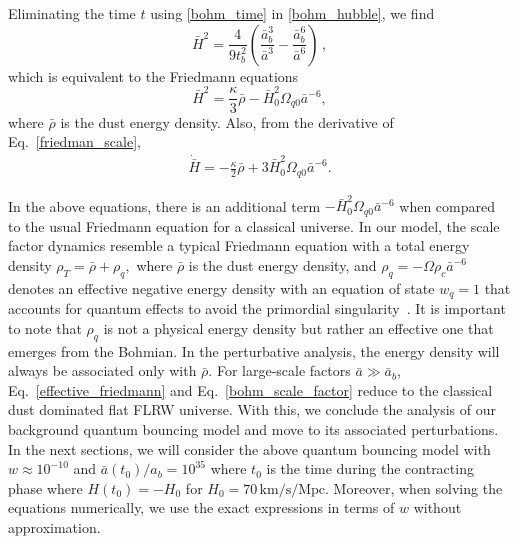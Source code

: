 \documentclass[a4paper,11pt]{article}
\newcommand{\dpar}[1]{\left(#1 \right)}
\begin{document}
Eliminating the time $t$ using \eqref{bohm_time} in \eqref{bohm_hubble}, we find
\begin{equation}
	\label{friedman_scale}
	\bar{H}^{2} = \frac{ 4 }{ 9t^{2}_{b}}\dpar
	{ \frac{ \bar{a}^{3}_{b} }{ \bar{a}^{3} } - \frac{\bar{a}_{b}^{6}}{ \bar{a}^{6} } }\, ,
\end{equation}
which is equivalent to the Friedmann equations
\begin{equation}\label{effective_friedmann}
	\bar{H}^{2} = \frac{\kappa}{ 3 }\bar\rho - \bar{H}^{2}_{0}\Omega_{q0}\bar{a}^{-6},
\end{equation}
where $\bar\rho$ is the dust energy density. {\color{red} Also, from the derivative of
		Eq.~\eqref{friedman_scale},
		\begin{align}
			\dot{\bar{H}} = - \frac{\kappa}{2} \bar\rho + 3\bar{H}^{2}_{0}\Omega_{q0}\bar{a}^{-6}.
		\end{align}
	}

In the above equations, there is an additional term
$-\bar{H}^{2}_{0}\Omega_{q0}\bar{a}^{-6}$ when compared to the usual Friedmann equation
for a classical universe. {\color{red} In our model, the scale factor dynamics resemble
		a typical Friedmann equation with a total energy density $\rho_{T} = \bar{\rho} +
			\rho_{q},$ where $\bar{\rho}$ is the dust energy density, and $\rho_{q} = -\Omega
			\rho_{c} \bar{a}^{-6}$ denotes an effective negative energy density with an equation of
		state $w_q = 1$ that accounts for quantum effects to avoid the primordial
		singularity~\cite{vitenti2012large}. It is important to note that $\rho_{q}$ is not a
		physical energy density but rather an effective one that emerges from the Bohmian. In
		the perturbative analysis, the energy density will always be associated only with
		$\bar{\rho}$. For large-scale factors $\bar{a} \gg \bar{a}_{b} $,
		Eq.~\eqref{effective_friedmann} and Eq.~\eqref{bohm_scale_factor} reduce to the
		classical dust dominated flat FLRW universe. With this, we conclude the analysis of our
		background quantum bouncing model and move to its associated perturbations. In the next
		sections, we will consider the above quantum bouncing model with $w\approx 10^{-10}$ and
		$\bar{a}(t_0)/a_b = 10^{35}$ where $t_0$ is the time during the contracting phase where
		$H(t_0) = -H_0$ for $H_0 = 70 \, \text{km/s/Mpc}$. Moreover, when solving the equations
		numerically, we use the exact expressions in terms of $w$ without approximation.}


\end{document}
